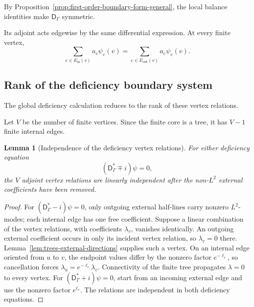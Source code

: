 \documentclass[11pt]{article}
\theoremstyle{plain}
\newtheorem{lemma}[theorem]{Lemma}
\theoremstyle{definition}
\begin{document}
By Proposition~\ref{prop:first-order-boundary-form-general}, the local
balance identities make \(\mathsf D_\Gamma\) symmetric.

Its adjoint acts edgewise by the same differential expression. At every
finite vertex,
\[
  \sum_{e\in E_{\mathrm{in}}(v)}
  a_e\psi_e(v)
  =
  \sum_{e\in E_{\mathrm{out}}(v)}
  a_e\psi_e(v).
\]

\subsection{Rank of the deficiency boundary system}
\label{subsec:trees-deficiency-rank}

The global deficiency calculation reduces to the rank of these vertex
relations.

Let \(V\) be the number of finite vertices. Since the finite core is a tree, it has \(V-1\) finite internal edges.

\begin{lemma}[Independence of the deficiency vertex relations]
\label{lem:trees-deficiency-rank}
For either deficiency equation
\[
  (\mathsf D_\Gamma^*\mp i)\psi=0,
\]
the \(V\) adjoint vertex relations are linearly independent after the
non-\(L^2\) external coefficients have been removed.
\end{lemma}

\begin{proof}
For \((\mathsf D_\Gamma^*-i)\psi=0\), only outgoing external half-lines carry nonzero \(L^2\)-modes; each internal edge has one free coefficient. Suppose a linear combination of the vertex relations, with coefficients \(\lambda_v\), vanishes identically. An outgoing external coefficient occurs in only its incident vertex relation, so \(\lambda_v=0\) there. Lemma~\ref{lem:trees-external-directions} supplies such a vertex. On an internal edge oriented from \(u\) to \(v\), the endpoint values differ by the nonzero factor \(e^{-\ell_e}\), so cancellation forces \(\lambda_u=e^{-\ell_e}\lambda_v\). Connectivity of the finite tree propagates \(\lambda=0\) to every vertex. For \((\mathsf D_\Gamma^*+i)\psi=0\), start from an incoming external edge and use the nonzero factor \(e^{\ell_e}\). The relations are independent in both deficiency equations.
\end{proof}

\end{document}
